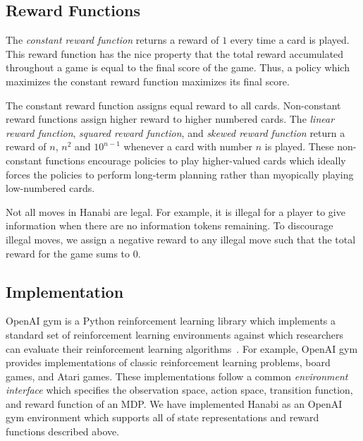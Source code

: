 
\subsection{Reward Functions}
The \emph{constant reward function} returns a reward of $1$ every time a card
is played. This reward function has the nice property that the total reward
accumulated throughout a game is equal to the final score of the game. Thus, a
policy which maximizes the constant reward function maximizes its final score.

The constant reward function assigns equal reward to all cards. Non-constant
reward functions assign higher reward to higher numbered cards. The
\emph{linear reward function}, \emph{squared reward function}, and \emph{skewed
reward function} return a reward of $n$, $n^2$ and $10^{n-1}$ whenever a card
with number $n$ is played. These non-constant functions encourage policies to
play higher-valued cards which ideally forces the policies to perform long-term
planning rather than myopically playing low-numbered cards.

Not all moves in Hanabi are legal. For example, it is illegal for a player to
give information when there are no information tokens remaining. To discourage
illegal moves, we assign a negative reward to any illegal move such that the
total reward for the game sums to 0.


\subsection{Implementation}
OpenAI gym is a Python reinforcement learning library which implements a
standard set of reinforcement learning environments against which researchers
can evaluate their reinforcement learning algorithms~\cite{brockman2016openai}.
For example, OpenAI gym provides implementations of classic reinforcement
learning problems, board games, and Atari games. These implementations follow a
common \emph{environment interface} which specifies the observation space,
action space, transition function, and reward function of an MDP. We have
implemented Hanabi as an OpenAI gym environment which supports all of state
representations and reward functions described above.

